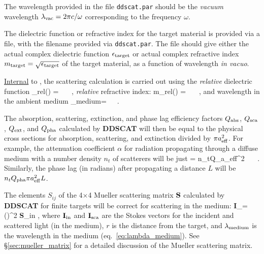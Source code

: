 The wavelength provided in the file {\tt ddscat.par} should be the
{\it vacuum} wavelength $\lambda_{\rm vac}=2\pi c/\omega$ 
corresponding to the frequency $\omega$.

The dielectric function or refractive index for the target material
is provided
via a file, with the filename provided via {\tt ddscat.par}.
The file should give either the 
actual complex dielectric function $\epsilon_{\rm target}$ 
or actual complex refractive index 
$m_{\rm target}=\sqrt{\epsilon_{\rm target}}$
of the target material, as a function of
wavelength {\it in vacuo}.


\underline{Internal} to \ddscatseventhree, the scattering calculation is 
carried out using
the {\it relative} dielectric function
\beq
\epsilon_{\rm rel}(\omega) = 
 ~~~,
\eeq
{\it relative} refractive index:
\beq
m_{\rm rel}(\omega) =
~~~,
\eeq
and wavelength in the ambient medium 
\beq
\lambda_{\rm medium}=~~~.
\label{eq:lambda_medium}
\eeq

The absorption, scattering, extinction, and phase lag 
efficiency factors $Q_{\rm abs}$,
$Q_{\rm sca}$, $Q_{\rm ext}$, and $Q_{\rm pha}$ calculated by {{\bf DDSCAT}}
will then be equal to the physical
cross sections for absorption, scattering, and extinction divided by
$\pi a_{\rm eff}^2$.
For example, the attenuation coefficient $\alpha$ for radiation
propagating through a diffuse medium with a number density $n_{t}$ of
scatterers will be just
\beq
\alpha = n_{t}Q_\ext\pi a_{\rm eff}^2
~~~.
\eeq
Similarly, the phase lag (in radians) after propagating a distance $L$ will be
$n_{t}Q_{\rm pha}\pi a_{\rm eff}^2 L$.

\medskip

The elements $S_{ij}$ of the 4$\times$4 Mueller scattering matrix ${\bf S}$
calculated by {{\bf DDSCAT}} for finite targets
will be correct for scattering in the medium:
\beq
{\bf I}_\sca = 
\left(\right)^2 
{\bf S}_{\rm in} ,
\eeq
where ${\bf I}_{\rm in}$ and ${\bf I}_{\rm sca}$ are the Stokes vectors for
the incident and scattered light (in the medium), 
$r$ is the distance from the target, and
$\lambda_{\rm medium}$ is the wavelength in the medium (eq.\ \ref{eq:lambda_medium}).
See \S\ref{sec:mueller_matrix} for a detailed discussion of the
Mueller scattering matrix.


